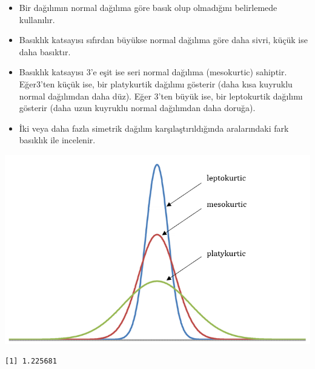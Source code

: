 \documentclass[
  letterpaper,
  DIV=11,
  numbers=noendperiod]{scrreprt}
\newenvironment{Shaded}{\begin{snugshade}}{\end{snugshade}}
\newcommand{\AttributeTok}[1]{\textcolor[rgb]{0.40,0.45,0.13}{#1}}
\newcommand{\CommentTok}[1]{\textcolor[rgb]{0.37,0.37,0.37}{#1}}
\newcommand{\ConstantTok}[1]{\textcolor[rgb]{0.56,0.35,0.01}{#1}}
\newcommand{\FunctionTok}[1]{\textcolor[rgb]{0.28,0.35,0.67}{#1}}
\newcommand{\NormalTok}[1]{\textcolor[rgb]{0.00,0.23,0.31}{#1}}
\newcommand{\SpecialCharTok}[1]{\textcolor[rgb]{0.37,0.37,0.37}{#1}}
\begin{document}
\begin{itemize}
\item
  Bir dağılımın normal dağılıma göre basık olup olmadığını belirlemede
  kullanılır.
\item
  Basıklık katsayısı sıfırdan büyükse normal dağılıma göre daha sivri,
  küçük ise daha basıktır.
\item
  Basıklık katsayısı 3'e eşit ise seri normal dağılıma (mesokurtic)
  sahiptir. Eğer3'ten küçük ise, bir platykurtik dağılımı gösterir (daha
  kısa kuyruklu normal dağılımdan daha düz). Eğer 3'ten büyük ise, bir
  leptokurtik dağılımı gösterir (daha uzun kuyruklu normal dağılımdan
  daha doruğa).
\item
  İki veya daha fazla simetrik dağılım karşılaştırıldığında aralarındaki
  fark basıklık ile incelenir.
\end{itemize}

\begin{center}
\includegraphics{images/kurtosis.png}
\end{center}

\begin{Shaded}
\end{Shaded}

\begin{verbatim}
[1] 1.225681
\end{verbatim}

\begin{Shaded}
\end{Shaded}
\end{document}
